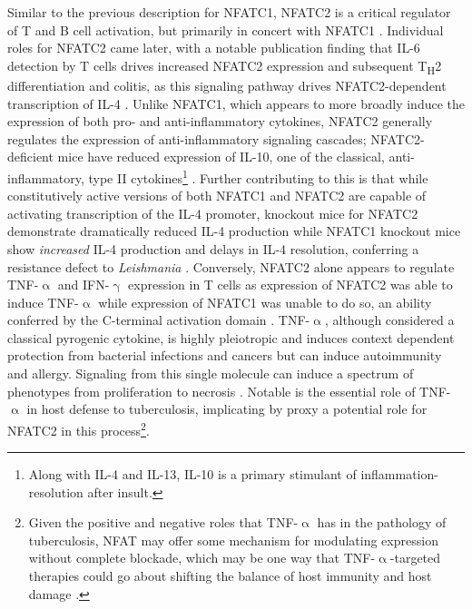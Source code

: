 Similar to the previous description for NFATC1, NFATC2 is a critical regulator of T and B cell activation, but primarily in concert with NFATC1 \citep{Peng2001}. Individual roles for NFATC2 came later, with a notable publication finding that IL\hyp{}6 detection by T cells drives increased NFATC2 expression and subsequent T\textsubscript{H}2 differentiation and colitis, as this signaling pathway drives NFATC2\hyp{}dependent transcription of IL\hyp{}4 \citep{Diehl2002, Weigmann2008}. Unlike NFATC1, which appears to more broadly induce the expression of both pro\hyp{} and anti\hyp{}inflammatory cytokines, NFATC2 generally regulates the expression of anti\hyp{}inflammatory signaling cascades; NFATC2\hyp{}deficient mice have reduced expression of IL\hyp{}10, one of the classical, anti\hyp{}inflammatory, type II cytokines\footnote{Along with IL\hyp{}4 and IL\hyp{}13, IL\hyp{}10 is a primary stimulant of inflammation\hyp{}resolution after insult.} \citep{Lee2009}. Further contributing to this is that while constitutively active versions of both NFATC1 and NFATC2 are capable of activating transcription of the IL\hyp{}4 promoter, knockout mice for NFATC2 demonstrate dramatically reduced IL\hyp{}4 production while NFATC1 knockout mice show \textit{increased} IL\hyp{}4 production \citep{Monticelli2002} and delays in IL\hyp{}4 resolution, conferring a resistance defect to \textit{Leishmania} \citep{Kiani1997}. Conversely, NFATC2 alone appears to regulate TNF\hyp{}$\upalpha$ and IFN\hyp{}$\upgamma$ expression in T cells as expression of NFATC2 was able to induce TNF\hyp{}$\upalpha$ while expression of NFATC1 was unable to do so, an ability conferred by the C\hyp{}terminal activation domain \citep{Kaminuma2008, Teixeira2005}. TNF\hyp{}$\upalpha$, although considered a classical pyrogenic cytokine, is highly pleiotropic and induces context dependent protection from bacterial infections and cancers but can induce autoimmunity and allergy. Signaling from this single molecule can induce a spectrum of phenotypes from proliferation to necrosis \citep{Gough2020}. Notable is the essential role of TNF\hyp{}$\upalpha$ in host defense to tuberculosis, implicating by proxy a potential role for NFATC2 in this process\footnote{Given the positive and negative roles that TNF-$\upalpha$ has in the pathology of tuberculosis, NFAT may offer some mechanism for modulating expression without complete blockade, which may be one way that TNF-$\upalpha$-targeted therapies could go about shifting the balance of host immunity and host damage \citep{Mootoo2009}.}. 

